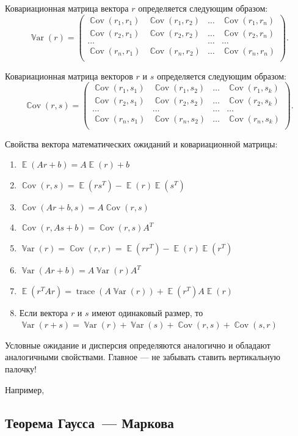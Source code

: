 \documentclass[12pt]{article}
\DeclareMathOperator{\Cov}{\mathbb{C}ov}
\DeclareMathOperator{\Var}{\mathbb{V}ar}
\DeclareMathOperator{\E}{\mathbb{E}}
\DeclareMathOperator{\trace}{trace}
\begin{document}
Ковариационная матрица вектора $r$ определяется следующим образом:
\[
\Var(r) = \begin{pmatrix}
	\Cov(r_1,r_1) & \Cov(r_1,r_2) & \dots & \Cov(r_1,r_n) \\
	\Cov(r_2,r_1) & \Cov(r_2,r_2) & \dots & \Cov(r_2,r_n) \\
        \dots & & \dots & \dots\\
        \Cov(r_n,r_1) & \Cov(r_n,r_2) & \dots & \Cov(r_n,r_n) \\
      \end{pmatrix}.
\]

Ковариационная матрица векторов $r$ и $s$ определяется следующим образом:
\[
\Cov(r,s) = \begin{pmatrix}
	\Cov(r_1,s_1) & \Cov(r_1,s_2) & \dots & \Cov(r_1,s_k) \\
	\Cov(r_2,s_1) & \Cov(r_2,s_2) & \dots & \Cov(r_2,s_k) \\
        \dots & \dots & \dots & \dots\\
        \Cov(r_n,s_1) & \Cov(r_n,s_2) & \dots & \Cov(r_n,s_k) \\
      \end{pmatrix}.
\]

Свойства вектора математических ожиданий и ковариационной матрицы:
\begin{enumerate}
    \item $\E(Ar+b) = A\E(r)+b$
    \item $\Cov(r,s) = \E(rs^T)-\E(r)\E(s^T)$
    \item $\Cov(Ar+b,s) = A\Cov(r,s)$
    \item $\Cov(r,As+b) = \Cov(r,s)A^T$
    \item $\Var(r)=\Cov(r,r) = \E(rr^T)-\E(r)\E(r^T)$
    \item $\Var(Ar+b) = A\Var(r)A^T$
    \item $\E(r^T Ar) = \trace(A\Var(r))+\E(r^T) A\E(r)$  
    \item Если вектора $r$ и $s$ имеют одинаковый размер, то
    $\Var(r + s) = \Var(r) + \Var(s) + \Cov(r, s) + \Cov(s, r)$
\end{enumerate}

Условные ожидание и дисперсия определяются аналогично и обладают аналогичными свойствами.
Главное — не забывать ставить вертикальную палочку!

Например, 



\subsection{Теорема Гаусса~— Маркова}
\end{document}
